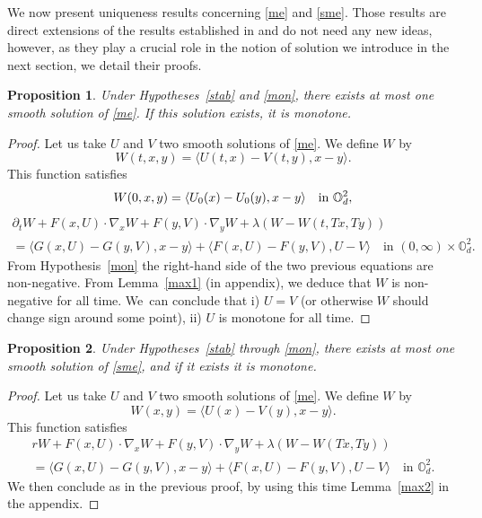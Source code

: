 \documentclass[10pt]{amsart}
\newtheorem{Prop}{Proposition}[section]
\theoremstyle{definition}
\begin{document}
We now present uniqueness results concerning \eqref{me} and \eqref{sme}. Those results are direct extensions of the results established in \cite{lions2007cours} and do not need any new ideas, however, as they play a crucial role in the notion of solution we introduce in the next section, we detail their proofs.
\begin{Prop}\label{uniq1}
Under Hypotheses~\ref{stab} and \ref{mon}, there exists at most one smooth solu\-tion of \eqref{me}. If this solution exists, it is monotone.
\end{Prop}
\begin{proof}
Let us take $U$ and $V$ two smooth solutions of \eqref{me}. We define $W$ by
\begin{equation*}
W(t,x,y) = \langle U(t,x)-V(t,y) , x-y \rangle.
\end{equation*}
This function satisfies
\begin{equation*}
W(0,x,y) = \langle U_0(x)-U_0(y), x-y\rangle \quad\text{in }\mathbb{O}_d^2,\vspace*{-5pt}
\end{equation*}
\begin{multline*}
\partial_t W+F(x,U)\cdot \nabla_x W+F(y,V)\cdot \nabla_y W+\lambda(W-W(t,Tx,Ty))\\
= \langle G(x,U)-G(y,V), x-y\rangle+\langle F(x,U)-F(y,V), U-V \rangle \quad\text{in } (0, \infty) \times \mathbb{O}_d^2.
\end{multline*}
From Hypothesis~\ref{mon} the right-hand side of the two previous equations are non-negative. From Lemma~\ref{max1} (in appendix), we deduce that $W$ is non-negative for all time. We~can conclude that i) $U = V$ (or otherwise $W$ should change sign around some point), ii) $U$ is monotone for all time.
\end{proof}
\begin{Prop}\label{uniq2}
Under Hypotheses~\ref{stab} through \ref{mon}, there exists at most one smooth solution of \eqref{sme}, and if it exists it is monotone.
\end{Prop}
\begin{proof}
Let us take $U$ and $V$ two smooth solutions of \eqref{me}. We define $W$ by
\begin{equation*}
W(x,y) = \langle U(x)-V(y) , x-y \rangle.
\end{equation*}
This function satisfies
\begin{multline*}
r W+F(x,U)\cdot \nabla_x W+F(y,V)\cdot \nabla_y W+\lambda(W-W(Tx,Ty))\\
= \langle G(x,U)-G(y,V), x-y\rangle+\langle F(x,U)-F(y,V), U-V \rangle \quad\text{in }\mathbb{O}_d^2.
\end{multline*}
We then conclude as in the previous proof, by using this time Lemma~\ref{max2} in the appendix.
\end{proof}
\end{document}
